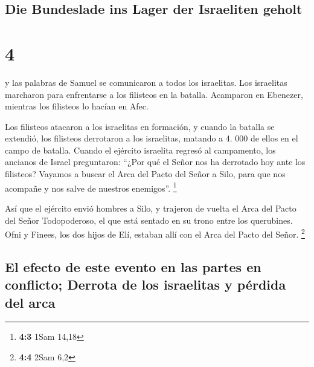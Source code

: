 \hypertarget{die-bundeslade-ins-lager-der-israeliten-geholt}{%
\subsection{Die Bundeslade ins Lager der Israeliten
geholt}\label{die-bundeslade-ins-lager-der-israeliten-geholt}}

\hypertarget{section-3}{%
\section{4}\label{section-3}}

 y las palabras de Samuel se comunicaron a todos los
israelitas. Los israelitas marcharon para enfrentarse a los filisteos en
la batalla. Acamparon en Ebenezer, mientras los filisteos lo hacían en
Afec.

 Los filisteos atacaron a los israelitas en formación, y
cuando la batalla se extendió, los filisteos derrotaron a los
israelitas, matando a 4. 000 de ellos en el campo de batalla.
 Cuando el ejército israelita regresó al campamento, los
ancianos de Israel preguntaron: ``¿Por qué el Señor nos ha derrotado hoy
ante los filisteos? Vayamos a buscar el Arca del Pacto del Señor a Silo,
para que nos acompañe y nos salve de nuestros enemigos''. \footnote{\textbf{4:3}
  1Sam 14,18}

 Así que el ejército envió hombres a Silo, y trajeron de
vuelta el Arca del Pacto del Señor Todopoderoso, el que está sentado en
su trono entre los querubines. Ofni y Finees, los dos hijos de Elí,
estaban allí con el Arca del Pacto del Señor. \footnote{\textbf{4:4}
  2Sam 6,2}

\hypertarget{el-efecto-de-este-evento-en-las-partes-en-conflicto-derrota-de-los-israelitas-y-puxe9rdida-del-arca}{%
\subsection{El efecto de este evento en las partes en conflicto; Derrota
de los israelitas y pérdida del
arca}\label{el-efecto-de-este-evento-en-las-partes-en-conflicto-derrota-de-los-israelitas-y-puxe9rdida-del-arca}}

